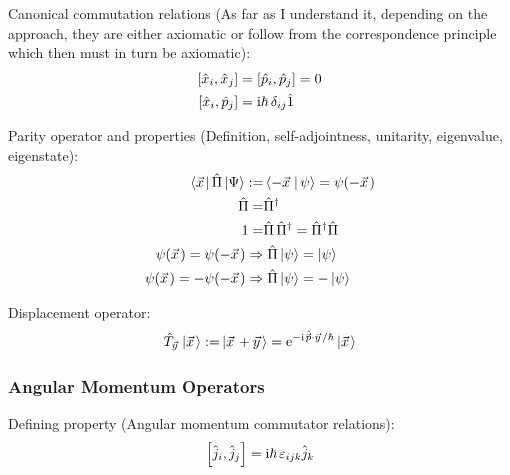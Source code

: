 		\noindent
		Canonical commutation relations (As far as I understand it, depending on the approach, they are either axiomatic or follow from the correspondence principle which then must in turn be axiomatic):
		\begin{equation}
			\begin{aligned}
				\comm{\hat{x}_i}{\hat{x}_j } &= \comm{\hat{p}_i}{\hat{p}_j} = 0 \\
				\comm{\hat{x}_i}{\hat{p}_j } &= \i\hbar\, \delta_{ij}\hat{1} \\
			\end{aligned}
		\end{equation}

		\noindent
		Parity operator and properties (Definition, self-adjointness, unitarity, eigenvalue, eigenstate):
		\begin{equation}
			\begin{aligned}
				\Bra{\vec{x}} \hat{\Pi} \Ket{\Psi} :=& \Braket{-\vec{x} | \psi} = \psi(-\vec{x}) \\
				\hat{\Pi} =& \hat{\Pi}^\dagger\\
				1 =& \hat{\Pi} \,\hat{\Pi}^\dagger = \hat{\Pi}^\dagger \hat{\Pi} \\
				\psi(\vec{x}) = \psi(-\vec{x}) \Rightarrow&\; \hat{\Pi}\Ket{\psi} = \Ket{\psi} \\
				\psi(\vec{x}) = -\psi(-\vec{x}) \Rightarrow&\; \hat{\Pi}\Ket{\psi} = -\Ket{\psi} \\
			\end{aligned}
		\end{equation}

		\noindent
		Displacement operator:
		\begin{equation}
			\begin{aligned}
				\hat{T}_{\vec{y}}\Ket{\vec{x}} :=& \Ket{\vec{x} + \vec{y}} = \ex^{-\i\hat{\vec{p}}\cdot\vec{y}/\hbar}\Ket{\vec{x}} \\
			\end{aligned}
		\end{equation}

	\subsubsection{Angular Momentum Operators}
		\noindent
		Defining property (Angular momentum commutator relations):
		\begin{equation}
			\left[ \hat{j}_i, \hat{j}_j \right] = \mathrm{i}\hbar\, \varepsilon_{ijk} \hat{j}_k
		\end{equation}

